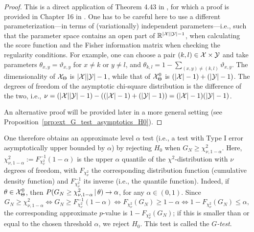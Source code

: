 \begin{proof}
This is a direct application of Theorem 4.43 in \cite{Bijma++2017}, for which a proof is
provided in Chapter 16 in \cite{Vandervaart1998}.
One has to be careful here to use a different parameterization---in
terms of (variationally) independent parameters---i.e.,
such that the parameter space contains an open part of $\mathbb{R}^{|\mathcal{X}||\mathcal{Y}|-1}$,
when calculating the score function and the Fisher information matrix
when checking the regularity conditions.
For example, one can choose a pair $(k,l) \in \mathcal{X} \times \mathcal{Y}$ and take
parameters $\theta_{x,y} = \vartheta_{x,y}$ for $x \ne k$ or $y \ne l$, and
$\theta_{k,l} = 1 - \sum_{(x,y) \ne (k,l)} \vartheta_{x,y}$. 
The dimensionality of $\mathcal{X}_\Theta$ is $|\mathcal{X}||\mathcal{Y}| - 1$, while
that of $\mathcal{X}_\Theta^0$ is $(|\mathcal{X}|-1) + (|\mathcal{Y}|-1)$. The degrees
of freedom of the asymptotic chi-square distribution is the difference of the two, i.e.,
$\nu = (|\mathcal{X}||\mathcal{Y}|-1)   -   ((|\mathcal{X}|-1) + (|\mathcal{Y}|-1)) = (|\mathcal{X}| - 1)(|\mathcal{Y}| - 1)$.

An alternative proof will be provided later in a more general setting (see Proposition~\ref{prp:ext_G_test_asymptotics_H0}).
\end{proof}

One therefore obtains an approximate level $\alpha$ test (i.e., a test with Type I error asymptotically upper bounded by $\alpha$) 
by rejecting $H_0$ when $G_N \ge \chi_{\nu,1-\alpha}^2$. Here,
$\chi^2_{\nu,1-\alpha} := F_{\chi^2_\nu}^{-1}(1-\alpha)$ is the upper $\alpha$ quantile of the $\chi^2$-distribution with $\nu$ degrees of freedom, with $F_{\chi^2_\nu}$ the corresponding distribution function (cumulative density function) and $F^{-1}_{\chi^2_\nu}$ its inverse (i.e., the quantile function).
Indeed, if $\theta \in \mathcal{X}_\Theta^0$, then $P(G_N \ge \chi_{\nu,1-\alpha}^2 \operatorname*{|} \theta) \to \alpha$, for any $\alpha \in (0,1)$.
Since 
$$G_N \ge \chi_{\nu,1-\alpha}^2 \iff G_N \ge F_{\chi^2_\nu}^{-1}(1-\alpha) \iff F_{\chi^2_\nu}(G_N) \ge 1-\alpha \iff 1-F_{\chi^2_\nu}(G_N) \le \alpha,$$
the corresponding approximate $p$-value is $1 - F_{\chi^2_\nu}(G_N)$; if this is smaller than or equal to the chosen threshold $\alpha$, 
we reject $H_0$.
This test is called the \emph{$G$-test}.

